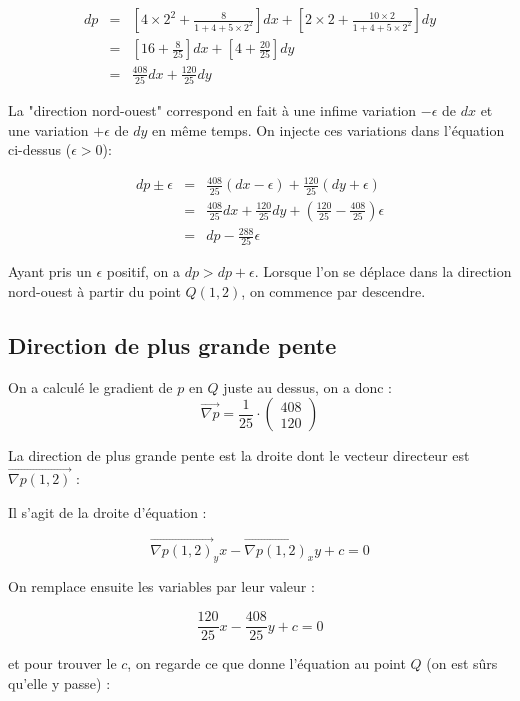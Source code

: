 \documentclass[a4paper, 11pt]{report} %
\newcommand{\vect}{\overrightarrow}
\begin{document}
\begin{eqnarray*}
    dp  & = & \left[4\times2^2 + \frac{8}{1+4+5\times2^2}\right]dx+\left[2\times2 + \frac{10\times2}{1+4+5\times2^2}\right]dy\\
        & = & \left[16+\frac{8}{25}\right]dx+\left[4+\frac{20}{25}\right]dy\\
        & = & \frac{408}{25}dx + \frac{120}{25}dy
\end{eqnarray*}

La "direction nord-ouest" correspond en fait à une infime variation $-\epsilon$ de $dx$ et une variation $+\epsilon$ de $dy$ en
même temps. On injecte ces variations dans l'équation ci-dessus ($\epsilon > 0$):

\begin{eqnarray*}
    dp \pm\epsilon  & = & \frac{408}{25}(dx-\epsilon) + \frac{120}{25}(dy + \epsilon)\\
                    & = & \frac{408}{25}dx + \frac{120}{25}dy + \left(\frac{120}{25} - \frac{408}{25}\right)\epsilon\\
                    & = & dp - \frac{288}{25}\epsilon
\end{eqnarray*}

Ayant pris un $\epsilon$ positif, on a $dp > dp + \epsilon$. Lorsque l'on se déplace dans la direction nord-ouest à
partir du point $Q(1,2)$, on commence par descendre.

\subsection{Direction de plus grande pente}

On a calculé le gradient de $p$ en $Q$ juste au dessus, on a donc : $$\vect{\nabla p} = \frac{1}{25}\cdot\begin{pmatrix} 408\\120 \end{pmatrix}$$

La direction de plus grande pente est la droite dont le vecteur directeur est $\vect{\nabla p(1,2)}$ :

Il s'agit de la droite d'équation :

\[
    \vect{\nabla p(1,2)}_yx - \vect{\nabla p(1,2)}_x y + c = 0
\]

On remplace ensuite les variables par leur valeur :

\[
    \frac{120}{25}x - \frac{408}{25}y + c = 0
\]

et pour trouver le $c$, on regarde ce que donne l'équation au point $Q$ (on est sûrs qu'elle y passe) :
\end{document}

